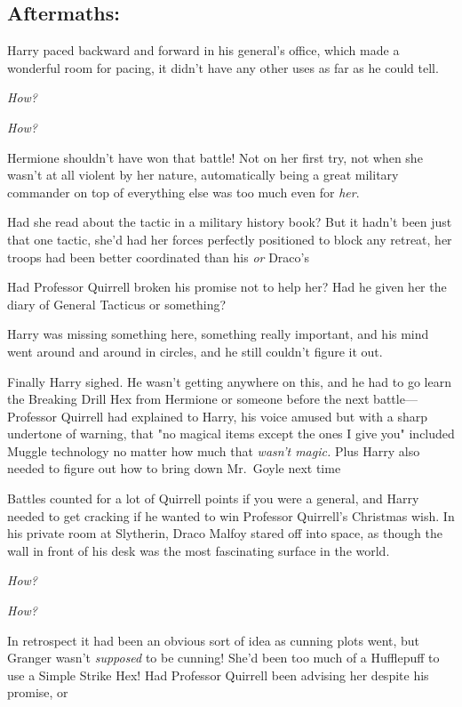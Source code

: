 
\subsection{Aftermaths:}

Harry paced backward and forward in his general's office, which made a
wonderful room for pacing, it didn't have any other uses as far as he could
tell.

\emph{How?}

\emph{How?}

Hermione shouldn't have won that battle! Not on her first try, not when she
wasn't at all violent by her nature, automatically being a great military
commander on top of everything else was too much even for \emph{her}.

Had she read about the tactic in a military history book? But it hadn't been
just that one tactic, she'd had her forces perfectly positioned to block any
retreat, her troops had been better coordinated than his \emph{or}
Draco's{\el}

Had Professor Quirrell broken his promise not to help her? Had he given her the
diary of General Tacticus or something?

Harry was missing something here, something really important, and his mind went
around and around in circles, and he still couldn't figure it out.

Finally Harry sighed. He wasn't getting anywhere on this, and he had to go
learn the Breaking Drill Hex from Hermione or someone before the next
battle---Professor Quirrell had explained to Harry, his voice amused but with a
sharp undertone of warning, that "no magical items except the ones I give you"
included Muggle technology no matter how much that \emph{wasn't magic.} Plus
Harry also needed to figure out how to bring down Mr.~Goyle next time{\el}

Battles counted for a lot of Quirrell points if you were a general, and Harry
needed to get cracking if he wanted to win Professor Quirrell's Christmas wish.
\sbreak
In his private room at Slytherin, Draco Malfoy stared off into space, as though
the wall in front of his desk was the most fascinating surface in the world.

\emph{How?}

\emph{How?}

In retrospect it had been an obvious sort of idea as cunning plots went, but
Granger wasn't \emph{supposed} to be cunning! She'd been too much of a
Hufflepuff to use a Simple Strike Hex! Had Professor Quirrell been advising her
despite his promise, or{\el}

